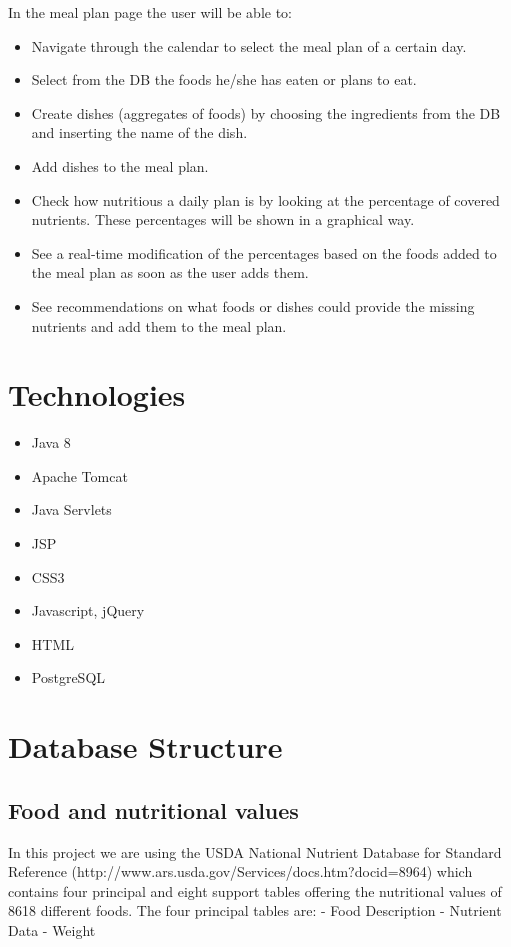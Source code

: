 \documentclass{article}
\begin{document}
In the meal plan page the user will be able to:
\begin{itemize}

  \item Navigate through the calendar to select the meal plan of a certain day.
  \item Select from the DB the foods he/she has eaten or plans to eat.
  \item Create dishes (aggregates of foods) by choosing the ingredients from the DB and inserting the name of the dish.
  \item Add dishes to the meal plan. 
  \item Check how nutritious a daily plan is by looking at the percentage of covered nutrients. These percentages will be shown in a graphical way.
  \item See a real-time modification of the percentages based on the foods added to the meal plan as soon as the user adds them.
  \item See recommendations on what foods or dishes could provide the missing nutrients and add them to the meal plan.
\end{itemize}


\section{Technologies}

\begin{itemize}

  \item Java 8
  \item Apache Tomcat
  \item Java Servlets
  \item JSP
  \item CSS3
  \item Javascript, jQuery
  \item HTML
  \item PostgreSQL
\end{itemize}
\clearpage

\section{Database Structure}
\subsection{Food and nutritional values}
In this project we are using the USDA National Nutrient Database for Standard Reference (http://www.ars.usda.gov/Services/docs.htm?docid=8964) which contains four principal and eight support tables offering the nutritional values of 8618 different foods.
The four principal tables are:
- Food Description
- Nutrient Data
- Weight
\end{document}
